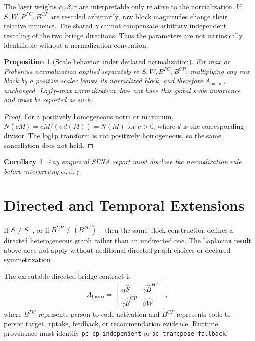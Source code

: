 \documentclass[11pt]{article}
\newtheorem{proposition}{Proposition}
\newtheorem{corollary}{Corollary}
\theoremstyle{definition}
\newcommand{\Af}{A_{\mathrm{fusion}}}
\newcommand{\Shat}{\widehat S}
\newcommand{\What}{\widehat W}
\newcommand{\Bpchat}{\widehat B^{PC}}
\newcommand{\Bcphat}{\widehat B^{CP}}
\begin{document}
The layer weights \(\alpha,\beta,\gamma\) are interpretable only relative to
the normalization. If \(S,W,B^{PC},B^{CP}\) are rescaled arbitrarily, raw block
magnitudes change their relative influence. The shared \(\gamma\) cannot
compensate arbitrary independent rescaling of the two bridge directions. Thus
the parameters are not intrinsically identifiable without a normalization
convention.

\begin{proposition}[Scale behavior under declared normalization]
For max or Frobenius normalization applied separately to
\(S,W,B^{PC},B^{CP}\), multiplying any raw block by a positive scalar leaves
its normalized block, and therefore \(\Af\), unchanged. Log1p-max normalization
does not have this global scale invariance and must be reported as such.
\end{proposition}

\begin{proof}
For a positively homogeneous norm or maximum, \(N(cM)=cM/(c\,d(M))=N(M)\)
for \(c>0\), where \(d\) is the corresponding divisor. The log1p transform is
not positively homogeneous, so the same cancellation does not hold.
\end{proof}

\begin{corollary}
Any empirical SENA report must disclose the normalization rule before
interpreting \(\alpha,\beta,\gamma\).
\end{corollary}

\section{Directed and Temporal Extensions}

If \(S\ne S^\top\), or if \(B^{CP}\ne(B^{PC})^\top\), then the same block
construction defines a directed heterogeneous graph rather than an undirected
one. The Laplacian result above does not apply without additional directed-graph
choices or declared symmetrization.

The executable directed bridge contract is
\[
\Af=
\begin{bmatrix}
\alpha\Shat & \gamma\Bpchat\\
\gamma\Bcphat & \beta\What
\end{bmatrix},
\]
where \(B^{PC}\) represents person-to-code activation and \(B^{CP}\) represents
code-to-person target, uptake, feedback, or recommendation evidence. Runtime
provenance must identify \texttt{pc-cp-independent} or
\texttt{pc-transpose-fallback}.
\end{document}
